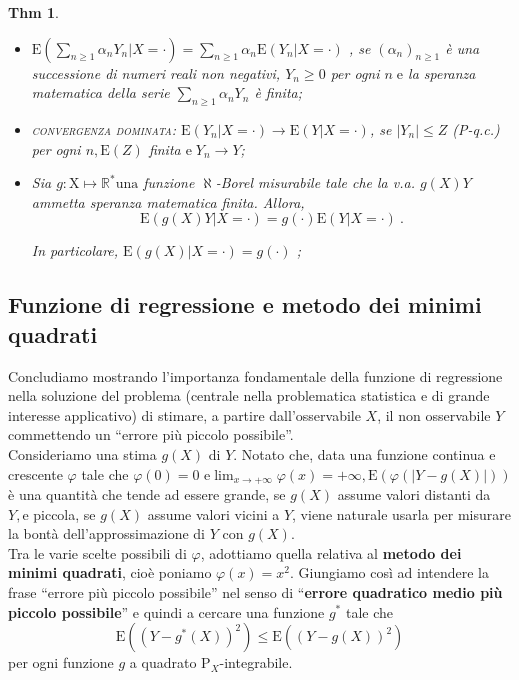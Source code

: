 \documentclass[a4paper,11pt]{article}
\theoremstyle{plain}
\newtheorem{thm}{Thm}[section]
\theoremstyle{definition}
\theoremstyle{remark}
\begin{document}
\begin{thm}
\begin{itemize}
\item $ \displaystyle \mathrm{E}(\sum_{n\geq 1}\alpha_{n}Y_{n}|X=\cdot)=\sum_{n\geq 1}\alpha_{n}\mathrm{E}(Y_{n}|X=\cdot)$ , se $(\alpha_{n})_{n\geq 1}$ \`{e} una successione di numeri reali non negativi, $Y_{n}\geq 0$ per ogni $n\mathrm{\; e}$ la speranza matematica della serie $\displaystyle \sum_{n\geq 1}\alpha_{n}Y_{n}$ \`{e} finita;

\item \textsc{convergenza dominata}: $\mathrm{E}(Y_{n}|X=\cdot)\rightarrow \mathrm{E}(Y|X=\cdot)$, se $|Y_{n}|\leq Z$ (P-q.c.) per ogni $n, \mathrm{E}(Z)$ finita $\mathrm{e \;}Y_{n}\rightarrow Y$;

\item Sia $g:\mathrm{X}\mapsto \mathbb{R}^{*}\mathrm{u}\mathrm{n}\mathrm{a}$ funzione $\aleph$-Borel misurabile tale che la v.a. $g(X)Y$ ammetta speranza matematica finita. Allora,
$$
\mathrm{E}(g(X)Y|X=\cdot)=g(\cdot) \mathrm{E}(Y|X=\cdot)\ .
$$  

In particolare, $\mathrm{E}(g(X)|X=\cdot)=g(\cdot)$ ;
\end{itemize}
\end{thm}

\noindent

\subsection{Funzione di regressione e  metodo dei minimi quadrati }
Concludiamo mostrando l'importanza fondamentale della funzione di regressione nella soluzione del problema (centrale nella problematica statistica $\mathrm{e}$ di grande interesse applicativo) di stimare, a partire dall'osservabile $X$, il non osservabile $Y$ commettendo un ``errore pi\`{u} piccolo possibile''.\\

\noindent
Consideriamo una stima $g(X)$ di $Y$. Notato $\mathrm{c}\mathrm{h}\mathrm{e}$, data una funzione continua $\mathrm{e}$ crescente $\varphi$ tale che $\displaystyle \varphi(0)=0$ $\mathrm{e}\lim_{x\rightarrow+\infty}\varphi(x)=+\infty, \mathrm{E}(\varphi(|Y-g(X)|))$ \`{e} una quantit\`{a} che tende ad essere grande, se $g(X)$ assume valori distanti da $Y, \mathrm{e}$ piccola, se $g(X)$ assume valori vicini a $Y$, viene naturale usarla per misurare la bont\`{a} dell'approssimazione di $Y$ con $g(X)$.\\

\noindent
Tra le varie scelte possibili di $\varphi$, adottiamo quella relativa al \textbf{metodo dei minimi quadrati}, cio\`{e} poniamo $\varphi(x)=x^{2}$. Giungiamo così ad intendere la frase ``errore pi\`{u} piccolo possibile'' nel senso di ``\textbf{errore quadratico medio pi\`{u} piccolo possibile}'' $\mathrm{e}$ quindi a cercare una funzione $g^{*}$ tale che
$$
\mathrm{E}((Y-g^{*}(X))^{2})\leq \mathrm{E}((Y-g(X))^{2})
$$
per ogni funzione $g$ a quadrato $\mathrm{P}_{X}$-integrabile.\\
\end{document}
